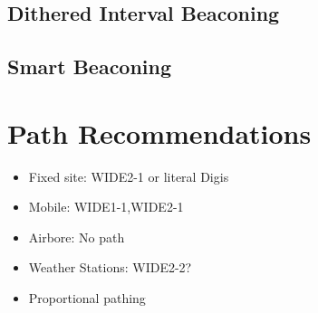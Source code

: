 \subsection{Dithered Interval Beaconing}

\subsection{Smart Beaconing}

\section{Path Recommendations}

\begin{itemize}
\item Fixed site: WIDE2-1 or literal Digis
\item Mobile: WIDE1-1,WIDE2-1
\item Airbore: No path
\item Weather Stations: WIDE2-2?
\item Proportional pathing
\end{itemize}

